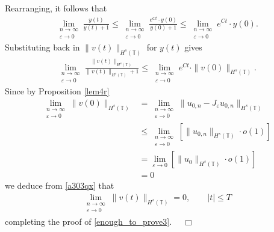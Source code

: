 \documentclass[12pt,reqno]{amsart}
\newcommand{\ci}{\mathbb{T}}
\newcommand{\ee}{\varepsilon}
\theoremstyle{plain}  %
\theoremstyle{definition}
\begin{document}
\begin{appendices}
Rearranging, it follows that 
\begin{equation*}
	\begin{split}
		\lim_{\substack{n \to \infty \\ \ee \to 0}} \frac{y(t)}{y(t) + 1}
		\le \lim_{\substack{n \to \infty \\ \ee \to 0}} \frac{e^{C t} \cdot y(0)}{y(0) + 1} \le
		\lim_{\substack{n \to \infty \\ \ee \to 0}} e^{C t} \cdot y(0).
	\end{split}
\end{equation*}
Substituting back in $\|v(t)\|_{H^s(\ci)}$ for $y(t)$ gives
\begin{equation}
	\begin{split}
		\lim_{\substack{n \to \infty \\ \ee \to 0}}	\frac{\|v(t)\|_{H^s(\ci)}}{\|v(t)\|_{H^s(\ci)} + 1}  \le
		\lim_{\substack{n \to \infty \\ \ee \to 0}} e^{C t} \cdot \|v(0)\|_{H^s(\ci)}.
		\label{a303qx}
	\end{split}
\end{equation}
Since by Proposition \ref{lem4r} 
\begin{equation*}
	\begin{split}
	\lim_{\substack{n \to \infty \\ \ee \to 0} }
	\|v(0)\|_{H^s(\ci)}
	& = \lim_{\substack{n \to \infty \\ \ee \to 0} }
	\|u_{0,n} - J_\ee u_{0,n} \|_{H^s(\ci)} 
	\\
	& \le  \lim_{\substack{n \to \infty \\ \ee \to 0}}
	\left [ \|u_{0,n}\|_{H^s(\ci)} \cdot o(1) \right ]
	\\
	& = \lim_{\ee \to 0} \left [ \|u_0\|_{H^s(\ci)} \cdot o(1) \right ]
	\\
	& = 0
	\end{split}
\end{equation*}
we deduce from \eqref{a303qx} that
\begin{equation*}
	\begin{split}
		\lim_{\substack{n \to \infty \\ \ee \to 0}} \|v(t)\|_{H^s(\ci)} = 0, \qquad |t| \le T
	\end{split}
\end{equation*}
completing the proof of \eqref{enough_to_prove3}. $\quad \Box$
%
%
%
\vskip0.1in

\end{appendices}
\end{document}
